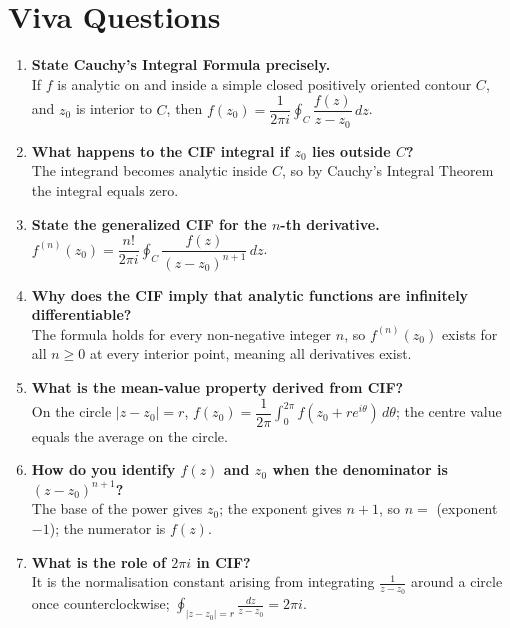 \documentclass[12pt,a4paper]{article}
\begin{document}
\section{Viva Questions}

\begin{enumerate}[label=\textbf{Q\arabic*.}, leftmargin=*]

  \item \textbf{State Cauchy's Integral Formula precisely.}\\
  If $f$ is analytic on and inside a simple closed positively oriented contour $C$,
  and $z_0$ is interior to $C$, then
  $f(z_0) = \dfrac{1}{2\pi i}\displaystyle\oint_{C}\dfrac{f(z)}{z-z_0}\,dz$.

  \item \textbf{What happens to the CIF integral if $z_0$ lies outside $C$?}\\
  The integrand becomes analytic inside $C$, so by Cauchy's Integral Theorem
  the integral equals zero.

  \item \textbf{State the generalized CIF for the $n$-th derivative.}\\
  $f^{(n)}(z_0) = \dfrac{n!}{2\pi i}\displaystyle\oint_{C}\dfrac{f(z)}{(z-z_0)^{n+1}}\,dz$.

  \item \textbf{Why does the CIF imply that analytic functions are infinitely differentiable?}\\
  The formula holds for every non-negative integer $n$, so $f^{(n)}(z_0)$ exists for
  all $n \geq 0$ at every interior point, meaning all derivatives exist.

  \item \textbf{What is the mean-value property derived from CIF?}\\
  On the circle $|z - z_0| = r$, $f(z_0) = \dfrac{1}{2\pi}\displaystyle\int_0^{2\pi}
  f(z_0 + re^{i\theta})\,d\theta$; the centre value equals the average on the circle.

  \item \textbf{How do you identify $f(z)$ and $z_0$ when the denominator is $(z - z_0)^{n+1}$?}\\
  The base of the power gives $z_0$; the exponent gives $n+1$, so $n = $ (exponent $-1$);
  the numerator is $f(z)$.

  \item \textbf{What is the role of $2\pi i$ in CIF?}\\
  It is the normalisation constant arising from integrating $\frac{1}{z - z_0}$
  around a circle once counterclockwise; $\oint_{|z-z_0|=r}\frac{dz}{z-z_0} = 2\pi i$.


\end{enumerate}
\end{document}
